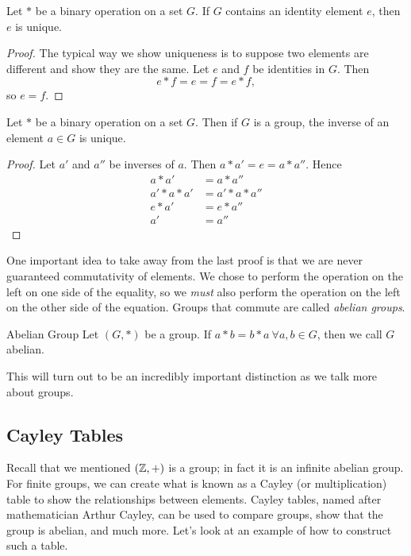 \begin{theorem}{}
	Let $*$ be a binary operation on a set $G$. If $G$ contains an identity element $e$, then $e$ is unique.
\end{theorem}
\begin{proof}
	The typical way we show uniqueness is to suppose two elements are different and show they are the same. Let $e$ and $f$ be identities in $G$. Then
	\[
		e*f=e=f=e*f,
	\]
	so $e=f$.
\end{proof}
\begin{theorem}{}\label{thm:inv_unique}
	Let $*$ be a binary operation on a set $G$. Then if $G$ is a group, the inverse of an element $a\in G$ is unique.
\end{theorem}
\begin{proof}
	Let $a'$ and $a''$ be inverses of $a$. Then $a*a'=e=a*a''$. Hence
	\begin{align*}
		a*a' &= a*a''\\
		a'*a*a' &= a'*a*a''\\
		e*a' &= e*a''\\
		a' &= a''
	\end{align*}
\end{proof}

One important idea to take away from the last proof is that we are never guaranteed commutativity of elements. We chose to perform the operation on the left on one side of the equality, so we \textit{must} also perform the operation on the left on the other side of the equation. Groups that commute are called \textit{abelian groups}.
\begin{definition}{Abelian Group}
	Let $(G,*)$ be a group. If $a*b=b*a\ \forall a,b\in G$, then we call $G$ abelian.
\end{definition}
This will turn out to be an incredibly important distinction as we talk more about groups.

\subsection*{Cayley Tables}
Recall that we mentioned $(\mathbb{Z},+)$ is a group; in fact it is an infinite abelian group. For finite groups, we can create what is known as a Cayley (or multiplication) table to show the relationships between elements. Cayley tables, named after mathematician Arthur Cayley, can be used to compare groups, show that the group is abelian, and much more. Let's look at an example of how to construct such a table.

